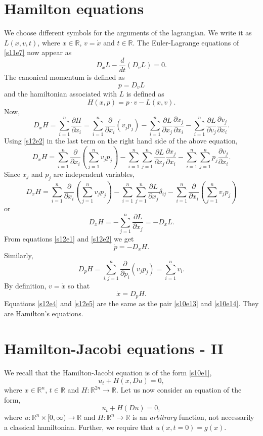 \documentclass{article}
\newcommand{\pd}[2]{\frac{\partial{#1}}{\partial{#2}}}
\theoremstyle{plain}
\numberwithin{thm}{section}
\theoremstyle{plain}
\numberwithin{prop}{section}
\theoremstyle{definition}
\numberwithin{defn}{section}
\theoremstyle{remark}
\numberwithin{equation}{section}
\begin{document}
\section{Hamilton equations}\label{s12}
We choose different symbols for the arguments of the lagrangian. We write it as $L(x,v,t)$, where
$x \in \mathbb{R}$, $v = \dot{x}$ and $t \in \mathbb{R}$. The Euler-Lagrange equations of 
\eqref{s11e7} now appear as
\begin{equation}\label{s12e1}
D_x L - \frac{d}{dt}\left(D_v L\right) = 0.
\end{equation}
The canonical momentum is defined as
\begin{equation}\label{s12e2}
p = D_{v}L
\end{equation}
and the hamiltonian associated with $L$ is defined as
\begin{equation}\label{s12e3}
H(x, p) = p \cdot v - L(x, v).
\end{equation}
Now,
\[
D_x H = \sum_{i=1}^n \pd{H}{x_i} = \sum_{i=1}^n \frac{\partial}{\partial x_i} (v_jp_j) - 
\sum_{i=1}^n \pd{L}{x_j}\pd{x_j}{x_i} - \sum_{i=1}^n\pd{L}{v_j}\pd{v_j}{x_i}.
\]
Using \eqref{s12e2} in the last term on the right hand side of the above equation,
\[
D_x H = \sum_{i=1}^n \frac{\partial}{\partial x_i} \left(\sum_{j=1}^nv_jp_j\right) - 
\sum_{i=1}^n \sum_{j=1}^n \pd{L}{x_j}\pd{x_j}{x_i} - \sum_{i=1}^n \sum_{j=1}^n p_j\pd{v_j}{x_i}.
\]
Since $x_j$ and $p_j$ are independent variables,
\[
D_x H = \sum_{i=1}^n \frac{\partial}{\partial x_i} \left(\sum_{j=1}^nv_jp_j\right) - 
\sum_{i=1}^n \sum_{j=1}^n \pd{L}{x_j}\delta_{ij} - 
\sum_{i=1}^n \frac{\partial}{\partial x_i} \left(\sum_{j=1}^nv_jp_j\right)
\]
or
\[
D_x H = -\sum_{j=1}^n \pd{L}{x_j} = -D_x L.
\]
From equations \eqref{s12e1} and \eqref{s12e2} we get
\begin{equation}\label{s12e4}
\dot{p} = -D_x H.
\end{equation}
Similarly,
\[
D_p H = \sum_{i,j=1}^n \frac{\partial}{\partial p_i} (v_jp_j) = \sum_{i=1}^n v_i.
\]
By definition, $v = \dot{x}$ so that
\begin{equation}\label{s12e5}
\dot{x} = D_p H.
\end{equation}
Equations \eqref{s12e4} and \eqref{s12e5} are the same as the pair \eqref{s10e13} and \eqref{s10e14}.
They are Hamilton's equations.

\section{Hamilton-Jacobi equations - II}\label{s13}
We recall that the Hamilton-Jacobi equation is of the form \eqref{s10e1},
\[
u_t + H(x, Du) = 0,
\]
where $x \in \mathbb{R}^n$, $t \in \mathbb{R}$ and $H: \mathbb{R}^{2n} \rightarrow \mathbb{R}$. Let 
us now consider an equation of the form,
\begin{equation}\label{s13e1}
u_t + H(Du) = 0,
\end{equation}
where $u: \mathbb{R}^n \times [0, \infty) \rightarrow \mathbb{R}$ and $H: \mathbb{R}^n \rightarrow
\mathbb{R}$ is an \emph{arbitrary} function, not necessarily a classical hamiltonian. Further, we 
require that $u(x,t = 0) = g(x)$. 
\end{document}
